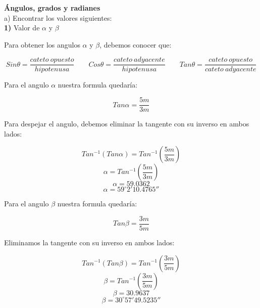 \documentclass[11pt]{report}
\begin{document}
\pagebreak \textbf {Ángulos, grados y radianes}\\[2mm]
a) Encontrar los valores siguientes:\\[2mm]
\indent \textbf { 1)} Valor de $\alpha$ y $\beta$ \\[2mm]
\begin{center}
\end{center}
Para obtener los angulos $\alpha$ y $\beta$, debemos conocer que: 

$$Sin\theta=\frac{cateto\:opuesto}{hipotenusa} \qquad Cos\theta=\frac{cateto\:adyacente}{hipotenusa} \qquad Tan\theta=\frac{cateto\:opuesto}{cateto\:adyacente}$$

Para el angulo $\alpha$ nuestra formula quedaría:

$$Tan\alpha=\frac{5m}{3m}$$

Para despejar el angulo, debemos eliminar la tangente con su inverso en ambos lados:

$$Tan^{-1}\left(Tan\alpha\right)=Tan^{-1}\left(\frac{5m}{3m}\right)$$
$$\alpha=Tan^{-1}\left(\frac{5m}{3m}\right)$$
$$\alpha=59.0362$$
$$\alpha=59^{\circ}2'10.4765''$$

Para el angulo $\beta$ nuestra formula quedaría:

$$Tan\beta=\frac{3m}{5m}$$

Eliminamos la tangente con su inverso en ambos lados:

$$Tan^{-1}\left(Tan\beta\right)=Tan^{-1}\left(\frac{3m}{5m}\right)$$
$$\beta=Tan^{-1}\left(\frac{3m}{5m}\right)$$
$$\beta=30.9637$$
$$\beta=30^{\circ}57'49.5235''$$
\end{document}
